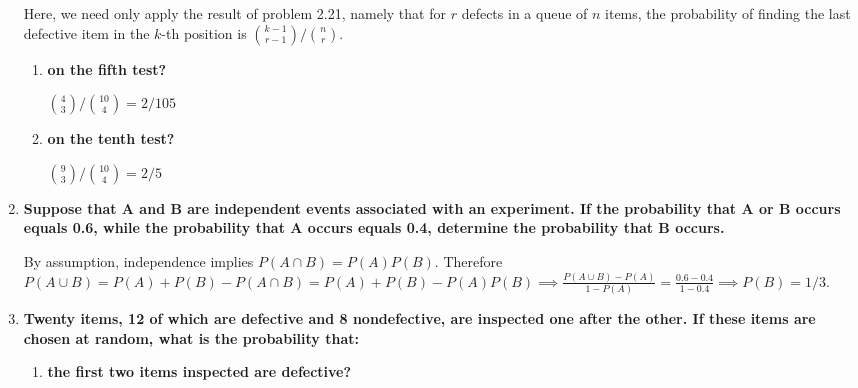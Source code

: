 \documentclass[10pt, oneside]{article}
\begin{document}
\begin{enumerate}[label=3.\arabic*]
Here, we need only apply the result of problem 2.21, namely that for $r$ defects in a queue of $n$ items, the probability of finding the last defective item in the $k$-th position is $\binom{k-1}{r-1} / \binom{n}{r}$.

	\begin{enumerate}
	\item  \begin{tcolorbox}[
	  colback=Cerulean!5!white,
	  colframe=Cerulean!75!black]
	\textbf{on the fifth test?}
	\end{tcolorbox}
	
	$\binom{4}{3} / \binom{10}{4} = \boxed{2/105}$
	
	\item  \begin{tcolorbox}[
	  colback=Cerulean!5!white,
	  colframe=Cerulean!75!black]
	\textbf{on the tenth test?}
	\end{tcolorbox}
	
	$\binom{9}{3} / \binom{10}{4} = \boxed{2/5}$
	
	\end{enumerate}

\item  \begin{tcolorbox}[
  colback=Cerulean!5!white,
  colframe=Cerulean!75!black]
\textbf{Suppose that $\bm{A}$ and $\bm{B}$ are independent events associated with an experiment. If the probability that $\bm{A}$ or $\bm{B}$ occurs equals 0.6, while the probability that $\bm{A}$ occurs equals 0.4, determine the probability that $\bm{B}$ occurs.}
\end{tcolorbox}

By assumption, independence implies $P(A \cap B) = P(A)P(B)$. Therefore $P(A \cup B) = P(A) + P(B) - P(A \cap B) = P(A) + P(B) - P(A)P(B) \implies \frac{P(A \cup B) - P(A)}{1 - P(A)} = \frac{0.6 - 0.4}{1 - 0.4} \implies \boxed{P(B) = 1/3}$.

\item  \begin{tcolorbox}[
  colback=Cerulean!5!white,
  colframe=Cerulean!75!black]
\textbf{Twenty items, 12 of which are defective and 8 nondefective, are inspected one after the other. If these items are chosen at random, what is the probability that:}
\end{tcolorbox}

	\begin{enumerate}

	\item  \begin{tcolorbox}[
	  colback=Cerulean!5!white,
	  colframe=Cerulean!75!black]
	\textbf{the first two items inspected are defective?}
	\end{tcolorbox}
	

\end{enumerate}
\end{enumerate}
\end{document}
